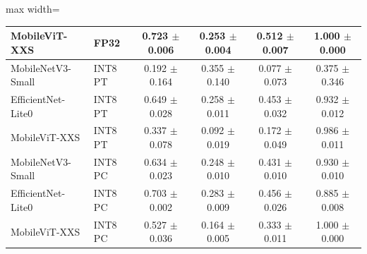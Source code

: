 \begin{table}[ht]
\begin{adjustbox}{max width=\textwidth}
\begin{tabular}{llcccc}
MobileViT-XXS           & FP32 & 0.723 $\pm$ 0.006 & 0.253 $\pm$ 0.004 & 0.512 $\pm$ 0.007 & 1.000 $\pm$ 0.000 \\
\midrule
MobileNetV3-Small       & INT8 PT & 0.192 $\pm$ 0.164 & 0.355 $\pm$ 0.140 & 0.077 $\pm$ 0.073 & 0.375 $\pm$ 0.346 \\
EfficientNet-Lite0      & INT8 PT & 0.649 $\pm$ 0.028 & 0.258 $\pm$ 0.011 & 0.453 $\pm$ 0.032 & 0.932 $\pm$ 0.012 \\
MobileViT-XXS           & INT8 PT & 0.337 $\pm$ 0.078 & 0.092 $\pm$ 0.019 & 0.172 $\pm$ 0.049 & 0.986 $\pm$ 0.011 \\
\midrule
MobileNetV3-Small       & INT8 PC & 0.634 $\pm$ 0.023 & 0.248 $\pm$ 0.010 & 0.431 $\pm$ 0.010 & 0.930 $\pm$ 0.010 \\
EfficientNet-Lite0      & INT8 PC & 0.703 $\pm$ 0.002 & 0.283 $\pm$ 0.009 & 0.456 $\pm$ 0.026 & 0.885 $\pm$ 0.008 \\
MobileViT-XXS           & INT8 PC & 0.527 $\pm$ 0.036 & 0.164 $\pm$ 0.005 & 0.333 $\pm$ 0.011 & 1.000 $\pm$ 0.000 \\
\bottomrule
\end{tabular}
\end{adjustbox}
\end{table}
